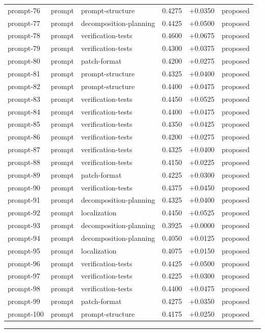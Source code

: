 \begin{center}
\begin{longtable}{llp{5.2cm}rrl}
prompt-76 & prompt & prompt-structure & 0.4275 & +0.0350 & proposed \\
prompt-77 & prompt & decomposition-planning & 0.4425 & +0.0500 & proposed \\
prompt-78 & prompt & verification-tests & 0.4600 & +0.0675 & proposed \\
prompt-79 & prompt & verification-tests & 0.4300 & +0.0375 & proposed \\
prompt-80 & prompt & patch-format & 0.4200 & +0.0275 & proposed \\
prompt-81 & prompt & prompt-structure & 0.4325 & +0.0400 & proposed \\
prompt-82 & prompt & prompt-structure & 0.4400 & +0.0475 & proposed \\
prompt-83 & prompt & verification-tests & 0.4450 & +0.0525 & proposed \\
prompt-84 & prompt & verification-tests & 0.4400 & +0.0475 & proposed \\
prompt-85 & prompt & verification-tests & 0.4350 & +0.0425 & proposed \\
prompt-86 & prompt & verification-tests & 0.4200 & +0.0275 & proposed \\
prompt-87 & prompt & verification-tests & 0.4325 & +0.0400 & proposed \\
prompt-88 & prompt & verification-tests & 0.4150 & +0.0225 & proposed \\
prompt-89 & prompt & patch-format & 0.4225 & +0.0300 & proposed \\
prompt-90 & prompt & verification-tests & 0.4375 & +0.0450 & proposed \\
prompt-91 & prompt & decomposition-planning & 0.4325 & +0.0400 & proposed \\
prompt-92 & prompt & localization & 0.4450 & +0.0525 & proposed \\
prompt-93 & prompt & decomposition-planning & 0.3925 & +0.0000 & proposed \\
prompt-94 & prompt & decomposition-planning & 0.4050 & +0.0125 & proposed \\
prompt-95 & prompt & localization & 0.4075 & +0.0150 & proposed \\
prompt-96 & prompt & verification-tests & 0.4425 & +0.0500 & proposed \\
prompt-97 & prompt & verification-tests & 0.4225 & +0.0300 & proposed \\
prompt-98 & prompt & verification-tests & 0.4400 & +0.0475 & proposed \\
prompt-99 & prompt & patch-format & 0.4275 & +0.0350 & proposed \\
prompt-100 & prompt & prompt-structure & 0.4175 & +0.0250 & proposed \\
\bottomrule\end{longtable}\end{center}
\par\bigskip\hrule\bigskip
